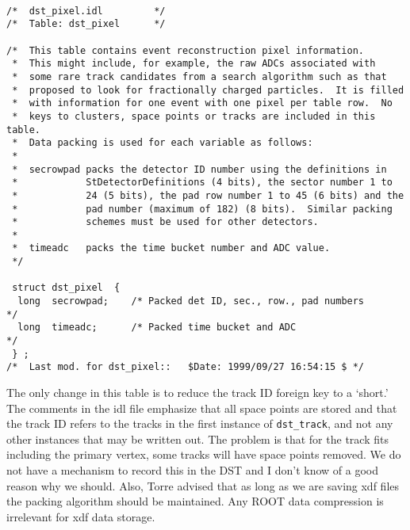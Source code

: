 \begin{verbatim}

/*  dst_pixel.idl         */
/*  Table: dst_pixel      */

/*  This table contains event reconstruction pixel information.
 *  This might include, for example, the raw ADCs associated with
 *  some rare track candidates from a search algorithm such as that
 *  proposed to look for fractionally charged particles.  It is filled
 *  with information for one event with one pixel per table row.  No
 *  keys to clusters, space points or tracks are included in this table.
 *  Data packing is used for each variable as follows:
 *
 *  secrowpad packs the detector ID number using the definitions in
 *            StDetectorDefinitions (4 bits), the sector number 1 to
 *            24 (5 bits), the pad row number 1 to 45 (6 bits) and the
 *            pad number (maximum of 182) (8 bits).  Similar packing
 *            schemes must be used for other detectors.
 *
 *  timeadc   packs the time bucket number and ADC value.
 */

 struct dst_pixel  {
  long  secrowpad;    /* Packed det ID, sec., row., pad numbers       */
  long  timeadc;      /* Packed time bucket and ADC                   */
 } ;
/*  Last mod. for dst_pixel::   $Date: 1999/09/27 16:54:15 $ */

\end{verbatim}

\vspace{0.1in}
\vspace{0.05in}

The only change in this table is to reduce the track ID foreign key to
a `short.'  The comments in the idl file emphasize that all space points
are stored and that the track ID refers to the tracks in the first
instance of {\tt dst\_track}, and not any other instances that may be
written out. The problem is that for the track fits including the
primary vertex, some tracks will have space points removed.  We do not
have a mechanism to record this in the DST and I don't know of a good
reason why we should.  Also, Torre advised that as long as we are saving
xdf files the packing algorithm should be maintained.  Any ROOT data
compression is irrelevant for xdf data storage.

